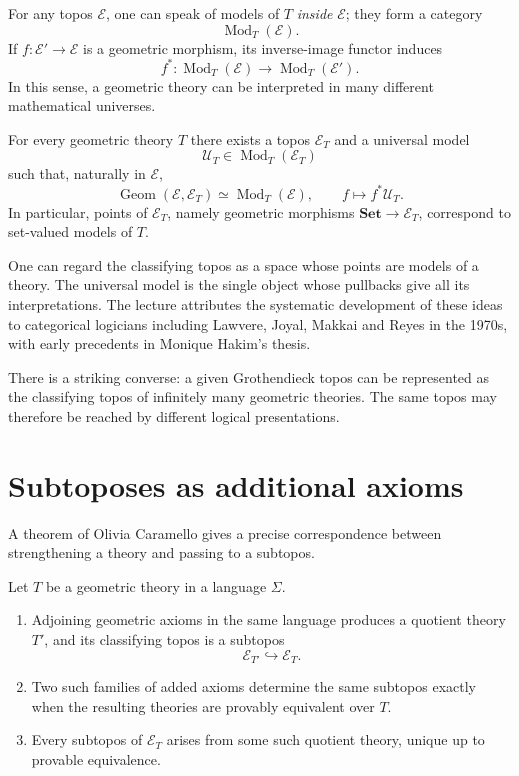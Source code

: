 For any topos \(\mathcal E\), one can speak of models of \(T\) \emph{inside} \(\mathcal E\); they form a category
\[
 \operatorname{Mod}_T(\mathcal E).
\]
If \(f:\mathcal E'\to\mathcal E\) is a geometric morphism, its inverse-image functor induces
\[
 f^*:\operatorname{Mod}_T(\mathcal E)\longrightarrow
 \operatorname{Mod}_T(\mathcal E').
\]
In this sense, a geometric theory can be interpreted in many different mathematical universes.

\begin{theorem}
For every geometric theory \(T\) there exists a topos \(\mathcal E_T\) and a universal model
\[
 \mathcal U_T\in\operatorname{Mod}_T(\mathcal E_T)
\]
such that, naturally in \(\mathcal E\),
\[
 \operatorname{Geom}(\mathcal E,\mathcal E_T)
 \simeq\operatorname{Mod}_T(\mathcal E),
 \qquad f\longmapsto f^*\mathcal U_T.
\]
In particular, points of \(\mathcal E_T\), namely geometric morphisms
\(\mathbf{Set}\to\mathcal E_T\), correspond to set-valued models of \(T\).
\end{theorem}

One can regard the classifying topos as a space whose points are models of a theory. The universal model is the single object whose pullbacks give all its interpretations. The lecture attributes the systematic development of these ideas to categorical logicians including Lawvere, Joyal, Makkai and Reyes in the 1970s, with early precedents in Monique Hakim's thesis.

There is a striking converse: a given Grothendieck topos can be represented as the classifying topos of infinitely many geometric theories. The same topos may therefore be reached by different logical presentations.

\section{Subtoposes as additional axioms}

A theorem of Olivia Caramello gives a precise correspondence between strengthening a theory and passing to a subtopos.

\begin{theorem}
Let \(T\) be a geometric theory in a language \(\Sigma\).
\begin{enumerate}
 \item Adjoining geometric axioms in the same language produces a quotient theory \(T'\), and its classifying topos is a subtopos
 \[
  \mathcal E_{T'}\hookrightarrow\mathcal E_T.
 \]
 \item Two such families of added axioms determine the same subtopos exactly when the resulting theories are provably equivalent over \(T\).
 \item Every subtopos of \(\mathcal E_T\) arises from some such quotient theory, unique up to provable equivalence.
\end{enumerate}
\end{theorem}

